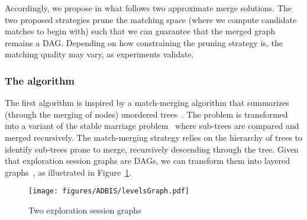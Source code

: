 % 
% 




Accordingly, we propose in what follows two approximate merge solutions. 
The two proposed strategies prune the matching space (where we compute candidate matches to begin with) such that we can guarantee that the merged graph remains a DAG. Depending on how constraining the pruning strategy is, the matching quality may vary, as experiments validate.   


\subsubsection{The \rlmLong{} algorithm}
The first algorithm is inspired by a match-merging algorithm that summarizes (through the merging of nodes) unordered trees~\cite{schulz:vissoft18}. The problem is transformed into a variant of the stable marriage problem~\cite{StableM} where sub-trees are compared and merged recursively. The match-merging strategy relies on the hierarchy of trees to identify sub-trees prone to merge, recursively descending through the tree. Given that exploration session graphs are DAGs, we can transform them into layered graphs~\cite{healy:gd02}, as illustrated in Figure~\ref{fig:graphs2}. 
\begin{figure}[t]
\centering
\texttt{[image: figures/ADBIS/levelsGraph.pdf]}
	\caption{Two exploration session graphs~\cite{Houssem:19:adbis}}
		\label{fig:graphs2}
\end{figure}

